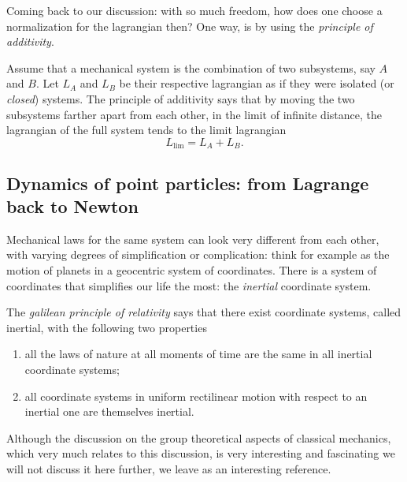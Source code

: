\documentclass[english,fontsize=11pt,paper=a5,oneside]{scrbook}
\theoremstyle{definition}
\begin{document}
Coming back to our discussion: with so much freedom, how does one choose a normalization for the lagrangian then?
One way, is by using the \emph{principle of additivity}.
\begin{tcolorbox}
  Assume that a mechanical system is the combination of two subsystems, say $A$ and $B$.
  Let $L_A$ and $L_B$ be their respective lagrangian as if they were isolated (or \emph{closed}) systems.
  The principle of additivity says that by moving the two subsystems farther apart from each other, in the limit of infinite distance, the lagrangian of the full system tends to the limit lagrangian
  \begin{equation}
    L_{\lim} = L_A + L_B.
  \end{equation}
\end{tcolorbox}


\subsection{Dynamics of point particles: from Lagrange back to Newton}\label{sec:dynamicspps}

Mechanical laws for the same system can look very different from each other, with varying degrees of simplification or complication: think for example as the motion of planets in a geocentric system of coordinates.
There is a system of coordinates that simplifies our life the most: the \emph{inertial} coordinate system.

\begin{tcolorbox}
  The \emph{galilean principle of relativity} says that there exist coordinate systems, called inertial, with the following two properties
  \begin{enumerate}
    \item all the laws of nature at all moments of time are the same in all inertial coordinate systems;
    \item all coordinate systems in uniform rectilinear motion with respect to an inertial one are themselves inertial.
  \end{enumerate}
\end{tcolorbox}

Although the discussion on the group theoretical aspects of classical mechanics, which very much relates to this discussion, is very interesting and fascinating we will not discuss it here further, we leave \cite{book:marsdenratiu} as an interesting reference.
\end{document}
